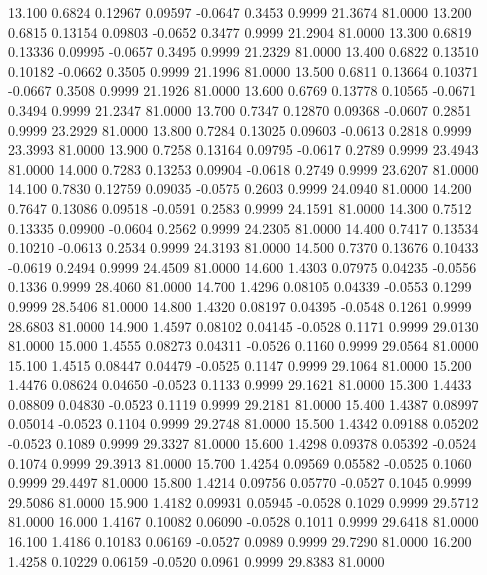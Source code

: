   13.100   0.6824   0.12967   0.09597  -0.0647   0.3453   0.9999  21.3674  81.0000
  13.200   0.6815   0.13154   0.09803  -0.0652   0.3477   0.9999  21.2904  81.0000
  13.300   0.6819   0.13336   0.09995  -0.0657   0.3495   0.9999  21.2329  81.0000
  13.400   0.6822   0.13510   0.10182  -0.0662   0.3505   0.9999  21.1996  81.0000
  13.500   0.6811   0.13664   0.10371  -0.0667   0.3508   0.9999  21.1926  81.0000
  13.600   0.6769   0.13778   0.10565  -0.0671   0.3494   0.9999  21.2347  81.0000
  13.700   0.7347   0.12870   0.09368  -0.0607   0.2851   0.9999  23.2929  81.0000
  13.800   0.7284   0.13025   0.09603  -0.0613   0.2818   0.9999  23.3993  81.0000
  13.900   0.7258   0.13164   0.09795  -0.0617   0.2789   0.9999  23.4943  81.0000
  14.000   0.7283   0.13253   0.09904  -0.0618   0.2749   0.9999  23.6207  81.0000
  14.100   0.7830   0.12759   0.09035  -0.0575   0.2603   0.9999  24.0940  81.0000
  14.200   0.7647   0.13086   0.09518  -0.0591   0.2583   0.9999  24.1591  81.0000
  14.300   0.7512   0.13335   0.09900  -0.0604   0.2562   0.9999  24.2305  81.0000
  14.400   0.7417   0.13534   0.10210  -0.0613   0.2534   0.9999  24.3193  81.0000
  14.500   0.7370   0.13676   0.10433  -0.0619   0.2494   0.9999  24.4509  81.0000
  14.600   1.4303   0.07975   0.04235  -0.0556   0.1336   0.9999  28.4060  81.0000
  14.700   1.4296   0.08105   0.04339  -0.0553   0.1299   0.9999  28.5406  81.0000
  14.800   1.4320   0.08197   0.04395  -0.0548   0.1261   0.9999  28.6803  81.0000
  14.900   1.4597   0.08102   0.04145  -0.0528   0.1171   0.9999  29.0130  81.0000
  15.000   1.4555   0.08273   0.04311  -0.0526   0.1160   0.9999  29.0564  81.0000
  15.100   1.4515   0.08447   0.04479  -0.0525   0.1147   0.9999  29.1064  81.0000
  15.200   1.4476   0.08624   0.04650  -0.0523   0.1133   0.9999  29.1621  81.0000
  15.300   1.4433   0.08809   0.04830  -0.0523   0.1119   0.9999  29.2181  81.0000
  15.400   1.4387   0.08997   0.05014  -0.0523   0.1104   0.9999  29.2748  81.0000
  15.500   1.4342   0.09188   0.05202  -0.0523   0.1089   0.9999  29.3327  81.0000
  15.600   1.4298   0.09378   0.05392  -0.0524   0.1074   0.9999  29.3913  81.0000
  15.700   1.4254   0.09569   0.05582  -0.0525   0.1060   0.9999  29.4497  81.0000
  15.800   1.4214   0.09756   0.05770  -0.0527   0.1045   0.9999  29.5086  81.0000
  15.900   1.4182   0.09931   0.05945  -0.0528   0.1029   0.9999  29.5712  81.0000
  16.000   1.4167   0.10082   0.06090  -0.0528   0.1011   0.9999  29.6418  81.0000
  16.100   1.4186   0.10183   0.06169  -0.0527   0.0989   0.9999  29.7290  81.0000
  16.200   1.4258   0.10229   0.06159  -0.0520   0.0961   0.9999  29.8383  81.0000
